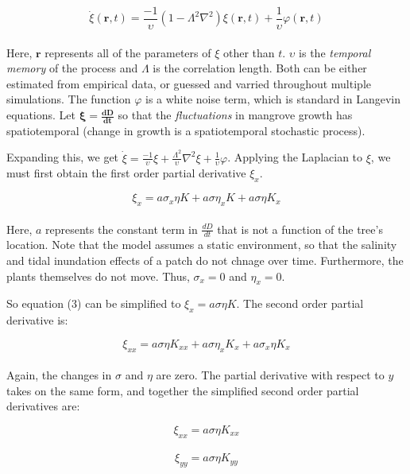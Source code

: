 \begin{equation}
\dot{\xi}(\boldsymbol{r},t) = \frac{-1}{\upsilon}(1 - \Lambda^2\nabla^2) \xi(\boldsymbol{r},t) + \frac{1}{\upsilon}\varphi(\boldsymbol{r},t)
\end{equation}\\

Here, $\boldsymbol{r}$ represents all of the parameters of $\xi$ other than $t$. $\upsilon$ is the \textit{temporal memory} of the process and $\Lambda$ is the correlation length. Both can be either estimated from empirical data, or guessed and varried throughout multiple simulations. The function $\varphi$ is a white noise term, which is standard in Langevin equations. Let $\boldsymbol{\xi = \frac{dD}{dt}}$ so that the \textit{fluctuations} in mangrove growth has spatiotemporal (change in growth is a spatiotemporal stochastic process).

Expanding this, we get $\dot{\xi} = \frac{-1}{\upsilon}\xi + \frac{\Lambda^2}{\upsilon}\nabla^2\xi + \frac{1}{\upsilon}\varphi$. Applying the Laplacian to $\xi$, we must first obtain the first order partial derivative $\xi_x$.

\begin{equation}
\xi_x = a\sigma_x\eta K + a\sigma\eta_x K + a\sigma\eta K_x
\end{equation}\\

Here, $a$ represents the constant term in $\frac{dD}{dt}$ that is not a function of the tree's location. Note that the model assumes a static environment, so that the salinity and tidal inundation effects of a patch do not chnage over time. Furthermore, the plants themselves do not move. Thus, $\sigma_x = 0$ and $\eta_x = 0$.

So equation (3) can be simplified to $\xi_x = a\sigma\eta K$. The second order partial derivative is:

\begin{equation}
\xi_{xx} = a\sigma\eta K_{xx} + a\sigma\eta_x K_x + a\sigma_x\eta K_x
\end{equation}\\

Again, the changes in $\sigma$ and $\eta$ are zero. The partial derivative with respect to $y$ takes on the same form, and together the simplified second order partial derivatives are:

\begin{equation}
\xi_{xx} = a\sigma\eta K_{xx}
\end{equation}\\
\begin{equation}
\xi_{yy} = a\sigma\eta K_{yy}
\end{equation}\\

